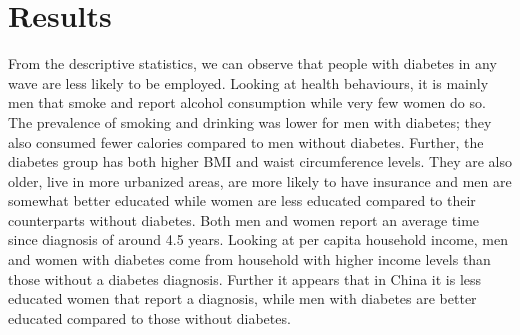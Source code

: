 \section{\label{sec:Results5}Results}

From the descriptive statistics, we can observe that people with diabetes in any wave are less likely to be employed. Looking at health behaviours, it is mainly men that smoke and report alcohol consumption while very few women do so. The prevalence of smoking and drinking was lower for men with diabetes; they also consumed fewer calories compared to men without diabetes. Further, the diabetes group has both higher \ac{BMI} and waist circumference levels. They are also older, live in more urbanized areas, are more likely to have insurance and men are somewhat better educated while women are less educated compared to their counterparts without diabetes. Both men and women report an average time since diagnosis of around 4.5 years. Looking at per capita household income, men and women with diabetes come from household with higher income levels than those without a diabetes diagnosis. Further it appears that in China it is less educated women that report a diagnosis, while men with diabetes are better educated compared to those without diabetes.

